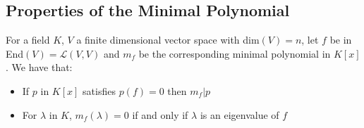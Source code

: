 \documentclass[a4paper, 12pt, twoside]{article}
\begin{document}
\subsection{Properties of the Minimal Polynomial}

For a field $K$, $V$ a finite dimensional vector space with dim$(V) = n$, let $f$ be in
End$(V) = \mathcal{L}(V, V)$ and $m_f$ be the corresponding minimal polynomial in $K[x]$.
We have that: \begin{itemize}
  \item If $p$ in $K[x]$ satisfies $p(f) = 0$ then $m_f | p$
  \item For $\lambda$ in $K$, $m_f(\lambda) = 0$ if and only if 
  $\lambda$ is an eigenvalue of $f$
\end{itemize}
\end{document}
